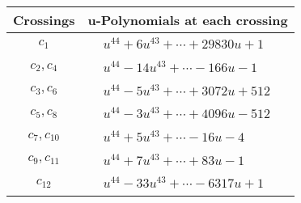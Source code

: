 \documentclass[1p]{elsarticle_modified}
\theoremstyle{definition}
\begin{document}
\begin{tabular}{m{50pt}|m{274pt}}
Crossings & \hspace{64pt}u-Polynomials at each crossing \\
\hline $$\begin{aligned}c_{1}\end{aligned}$$&$\begin{aligned}
&u^{44}+6 u^{43}+\cdots+29830 u+1
\end{aligned}$\\
\hline $$\begin{aligned}c_{2},c_{4}\end{aligned}$$&$\begin{aligned}
&u^{44}-14 u^{43}+\cdots-166 u-1
\end{aligned}$\\
\hline $$\begin{aligned}c_{3},c_{6}\end{aligned}$$&$\begin{aligned}
&u^{44}-5 u^{43}+\cdots+3072 u+512
\end{aligned}$\\
\hline $$\begin{aligned}c_{5},c_{8}\end{aligned}$$&$\begin{aligned}
&u^{44}-3 u^{43}+\cdots+4096 u-512
\end{aligned}$\\
\hline $$\begin{aligned}c_{7},c_{10}\end{aligned}$$&$\begin{aligned}
&u^{44}+5 u^{43}+\cdots-16 u-4
\end{aligned}$\\
\hline $$\begin{aligned}c_{9},c_{11}\end{aligned}$$&$\begin{aligned}
&u^{44}+7 u^{43}+\cdots+83 u-1
\end{aligned}$\\
\hline $$\begin{aligned}c_{12}\end{aligned}$$&$\begin{aligned}
&u^{44}-33 u^{43}+\cdots-6317 u+1
\end{aligned}$\\
\hline
\end{tabular}\\~\\
\newpage\renewcommand{\arraystretch}{1}
\end{document}
